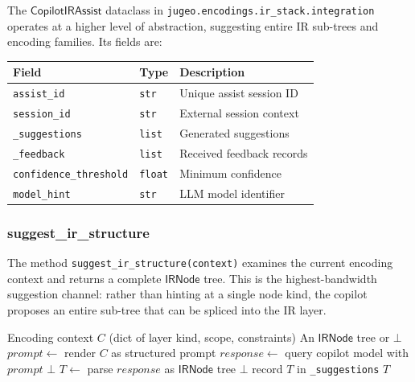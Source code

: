 \documentclass[11pt]{article}
\newcommand{\CIA}{\mathsf{CopilotIRAssist}}
\newcommand{\IRN}{\mathsf{IRNode}}
\newcommand{\conf}{\mathsf{conf}}
\begin{document}
The $\CIA$ dataclass in
\texttt{jugeo.encodings.ir\_stack.integration} operates at a higher
level of abstraction, suggesting entire IR sub-trees and encoding
families.  Its fields are:

\begin{center}
\begin{tabular}{l l p{5.7cm}}
\hline
\textbf{Field} & \textbf{Type} & \textbf{Description} \\
\hline
\texttt{assist\_id}            & \texttt{str}   & Unique assist
  session ID \\
\texttt{session\_id}           & \texttt{str}   & External session
  context \\
\texttt{\_suggestions}         & \texttt{list}  & Generated
  suggestions \\
\texttt{\_feedback}            & \texttt{list}  & Received
  feedback records \\
\texttt{confidence\_threshold} & \texttt{float} & Minimum confidence \\
\texttt{model\_hint}           & \texttt{str}   & LLM model identifier \\
\hline
\end{tabular}
\end{center}

\subsubsection{suggest\_ir\_structure}\label{sec:ir-struct}

The method \texttt{suggest\_ir\_structure(context)} examines the
current encoding context and returns a complete $\IRN$ tree.  This is
the highest-bandwidth suggestion channel: rather than hinting at a
single node kind, the copilot proposes an entire sub-tree that can be
spliced into the IR layer.

\begin{algorithm}[t]
\caption{$\CIA$.\texttt{suggest\_ir\_structure}}\label{alg:ir-struct}
\begin{algorithmic}[1]
\REQUIRE Encoding context $C$ (dict of layer kind, scope, constraints)
\ENSURE An $\IRN$ tree or $\bot$
\STATE $\mathit{prompt} \leftarrow$ render $C$ as structured prompt
\STATE $\mathit{response} \leftarrow$ query copilot model with
  $\mathit{prompt}$
\IF{$\conf(\mathit{response}) < \tau$}
  \RETURN $\bot$
\ENDIF
\STATE $T \leftarrow$ parse $\mathit{response}$ as $\IRN$ tree
  \RETURN $\bot$
\ENDIF
\STATE record $T$ in \texttt{\_suggestions}
\RETURN $T$
\end{algorithmic}
\end{algorithm}
\end{document}
